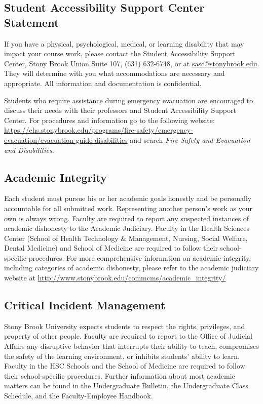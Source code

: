 \documentclass[10pt]{article}
\begin{document}
\subsection{Student Accessibility Support Center Statement}

If you have a physical, psychological, medical, or learning disability
that may impact your course work, please contact the Student
Accessibility Support Center, Stony Brook Union Suite 107, (631)
632-6748, or at \href{mailto:sasc@stonybrook.edu}{sasc@stonybrook.edu}. They will determine with you what
accommodations are necessary and appropriate. All information and
documentation is confidential.

Students who require assistance during emergency evacuation are
encouraged to discuss their needs with their professors and Student
Accessibility Support Center. For procedures and information go to the
following website:
\url{https://ehs.stonybrook.edu/programs/fire-safety/emergency-evacuation/evacuation-guide-disabilities}
and search {\em Fire Safety and Evacuation and Disabilities}.

\subsection{Academic Integrity}

Each student must pursue his or her academic goals honestly
and be personally accountable for all submitted work. Representing
another person's work as your own is always wrong. Faculty are
required to report any suspected instances of academic dishonesty to
the Academic Judiciary. Faculty in the Health Sciences Center (School
of Health Technology \& Management, Nursing, Social Welfare, Dental
Medicine) and School of Medicine are required to follow their
school-specific procedures. For more comprehensive information on
academic integrity, including categories of academic dishonesty,
please refer to the academic judiciary website at
\url{http://www.stonybrook.edu/commcms/academic\_integrity/}

\subsection{Critical Incident Management}

Stony Brook University expects students to respect the rights,
privileges, and property of other people. Faculty are required to
report to the Office of Judicial Affairs any disruptive behavior that
interrupts their ability to teach, compromises the safety of the
learning environment, or inhibits students' ability to learn.  Faculty
in the HSC Schools and the School of Medicine are required to follow
their school-specific procedures.  Further information about most
academic matters can be found in the Undergraduate Bulletin, the
Undergraduate Class Schedule, and the Faculty-Employee Handbook.
\end{document}
